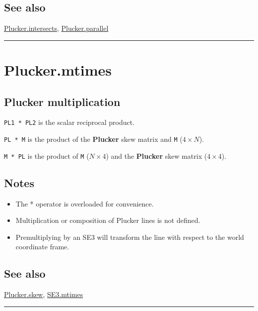 \subsection*{See also}


\hyperlink{Plucker.intersects}{\color{blue} Plucker.intersects}, \hyperlink{Plucker.parallel}{\color{blue} Plucker.parallel}

\vspace{1.5ex}\hrule

\hypertarget{Plucker.mtimes}{\section*{Plucker.mtimes}}
\subsection*{Plucker multiplication}


\texttt{PL1 * PL2} is the scalar reciprocal product.



\texttt{PL * M} is the product of the \textbf{\color{red} Plucker} skew matrix and \texttt{M} ($4 \times N$).



\texttt{M * PL} is the product of \texttt{M} ($N \times 4$) and the \textbf{\color{red} Plucker} skew matrix ($4 \times 4$).


\subsection*{Notes}
\begin{itemize}
  \item The * operator is overloaded for convenience.
  \item Multiplication or composition of Plucker lines is not defined.
  \item Premultiplying by an SE3 will transform the line with respect to the world     coordinate frame.
\end{itemize}

\subsection*{See also}


\hyperlink{Plucker.skew}{\color{blue} Plucker.skew}, \hyperlink{SE3.mtimes}{\color{blue} SE3.mtimes}

\vspace{1.5ex}\hrule

